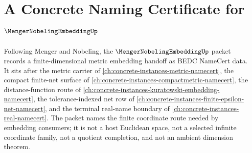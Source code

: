 \chapter{A Concrete Naming Certificate for $\MengerNobelingEmbeddingUp$}
\label{ch:concrete-instances-menger-nobeling-embedding-namecert}

Following Menger and Nobeling, the $\MengerNobelingEmbeddingUp$ packet records a finite-dimensional metric embedding handoff as BEDC NameCert data. It sits after the metric carrier of \autoref{ch:concrete-instances-metric-namecert}, the compact finite-net surface of \autoref{ch:concrete-instances-compactmetric-namecert}, the distance-function route of \autoref{ch:concrete-instances-kuratowski-embedding-namecert}, the tolerance-indexed net row of \autoref{ch:concrete-instances-finite-epsilon-net-namecert}, and the terminal real-name boundary of \autoref{ch:concrete-instances-real-namecert}. The packet names the finite coordinate route needed by embedding consumers; it is not a host Euclidean space, not a selected infinite coordinate family, not a quotient completion, and not an ambient dimension theorem.

